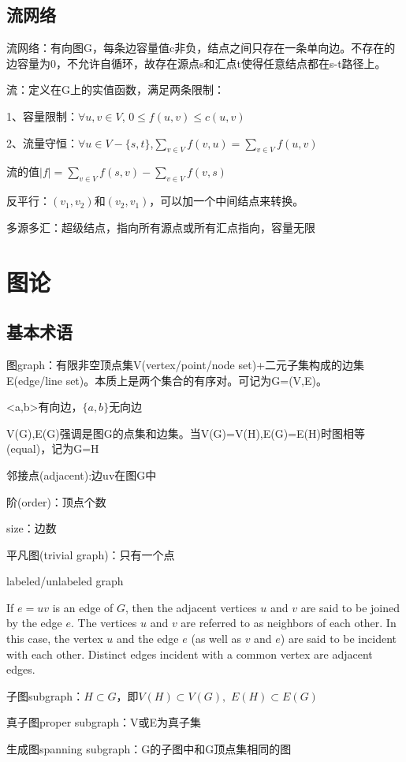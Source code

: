 \documentclass[cn,hazy,blue,screen,14pt]{note}
\begin{document}
\subsection{流网络}
流网络：有向图G，每条边容量值c非负，结点之间只存在一条单向边。不存在的边容量为0，不允许自循环，故存在源点s和汇点t使得任意结点都在s-t路径上。

流：定义在G上的实值函数，满足两条限制：

1、容量限制：$\forall u,v\in V$, $0\leq f(u,v)\leq c(u,v)$

2、流量守恒：$\forall u\in V-\{s,t\}$,$\sum_{v\in V}f(v,u)=\sum_{v\in V}f(u,v)$

流的值$|f|=\sum _{v\in V}f(s,v)-\sum_{v\in V}f(v,s)$

反平行：$(v_{1},v_{2})$和$(v_{2},v_{1})$，可以加一个中间结点来转换。

多源多汇：超级结点，指向所有源点或所有汇点指向，容量无限

\newpage
\section{图论}
\subsection{基本术语}
图graph：有限非空顶点集V(vertex/point/node set)+二元子集构成的边集E(edge/line set)。本质上是两个集合的有序对。可记为G=(V,E)。

<a,b>有向边，$\{a,b\}$无向边

V(G),E(G)强调是图G的点集和边集。当V(G)=V(H),E(G)=E(H)时图相等(equal)，记为G=H

邻接点(adjacent):边uv在图G中

阶(order)：顶点个数

size：边数

平凡图(trivial graph)：只有一个点

labeled/unlabeled graph

If $e = uv$ is an edge of $G$, then the adjacent vertices $u$ and $v$ are said to be
joined by the edge $e$. The vertices $u$ and $v$ are referred to as neighbors of each other. In this case, the
vertex $u$ and the edge $e$ (as well as $v$ and $e$) are said to be incident with each other. Distinct edges
incident with a common vertex are adjacent edges.

子图subgraph：$H\subset G$，即$V(H)\subset V(G),$ $E(H)\subset E(G)$

真子图proper subgraph：V或E为真子集

生成图spanning subgraph：G的子图中和G顶点集相同的图
\end{document}
